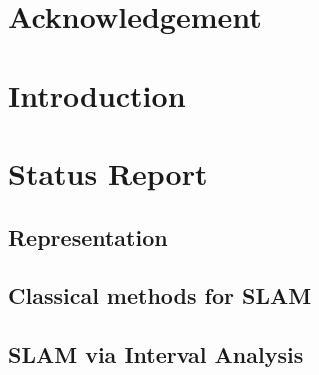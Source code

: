 \documentclass[12pt]{report} %
\begin{document}
\renewcommand{\contentsname}{Contents}	%
\renewcommand{\bibname}{Bibliography}	%




\tableofcontents  %
\cleardoublepage  %


\chapter*{Acknowledgement}

\listoffigures  %
\chapter*{Introduction}

\chapter{Status Report}
\section{Representation}

\section{Classical methods for SLAM}

\section{SLAM via Interval Analysis}
\label{sec:slamIA}

\end{document}
